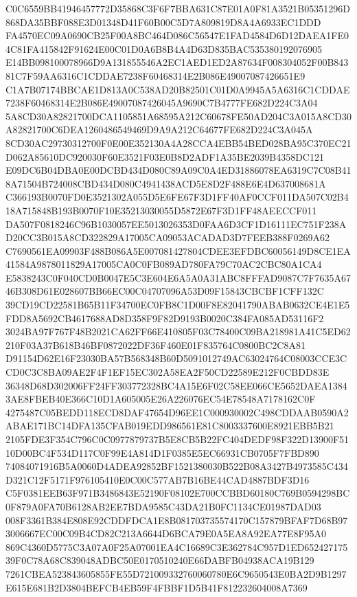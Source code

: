 \documentclass[UTF8,fontset=fandol,zihao=-4,a4paper]{ctexart}
\begin{document}
{{C0C6559BB41946457772D35868C3F6F7BBA631C87E01A0F81A3521B05351296D868DA35BBF088E3D01348D41F60B00C5D7A809819D8A4A6933EC1DDD
FA4570EC09A0690CB25F00A8BC464D086C56547E1FAD4584D6D12DAEA1FE04C81FA415842F91624E00C01D0A6B8B4A4D63D835BAC535380192076905
E14BB098100078966D9A131855546A2EC1AED1ED2A87634F008304052F00B84381C7F59AA6316C1CDDAE7238F60468314E2B086E49007087426651E9
C1A7B07174BBCAE1D813A0C538AD20B82501C01D0A9945A5A6316C1CDDAE7238F60468314E2B086E49007087426045A9690C7B4777FE682D224C3A04
5A8CD30A82821700DCA1105851A68595A212C60678FE50AD204C3A015A8CD30A82821700C6DEA1260486549469D9A9A212C64677FE682D224C3A045A
8CD30AC29730312700F0E00E352130A4A28CCA4EBB54BED028BA95C370EC21D062A85610DC920030F60E3521F03E0B8D2ADF1A35BE2039B4358DC121
E09DC6B04DBA0E00DCBD434D080C89A09C0A4ED31886078EA6319C7C08B418A71504B724008CBD434D080C4941438ACD5E8D2F488E6E4D637008681A
C366193B0070FD0E3521302A055D5E6FE67F3D1FF40AF0CCF011DA507C02B418A715848B193B0070F10E35213030055D5872E67F3D1FF48AEECCF011
DA507F0818246C96B1030057EE5013026353D0FAA6D3CF1D16111EC751F238AD20CC3B015A8CD322829A17005CA09053ACADAD3D7FEEB388F0269A62
C7690561EA09903F488B086A5E007081427804CDEE3EFDBC60056149D8CE1EA41584A9878011829A17005CA0C0FB089AD780FA79C70AC2CBC80A1CA4
E5838243C0F040CD0B0047E5C3E604E6A5A0A31ABC8FFFAD9087C7F7635A6746B308D61E028607BB66EC00C04707096A53D09F15843CBCBF1CFF132C
39CD19CD22581B65B11F34700EC0FB8C1D00F8E82041790ABAB0632CE4E1E5FDD8A5692CB4617688AD8D358F9F82D9193B0020C384FA085AD53116F2
3024BA97F767F48B2021CA62FF66E410805F03C78400C09BA218981A41C5ED62210F03A37B618B46BF0872022DF36F460E01F835764C0800BC2C8A81
D91154D62E16F23030BA57B568348B60D5091012749AC63024764C08003CCE3CCD0C3C8BA09AE2F4F1EF15EC302A58EA2F50CD22589E212F0CBDD83E
36348D68D302006FF24FF303772328BC4A15E6F02C58EE066CE5652DAEA13843AE8FBEB40E366C10D1A605005E26A226076EC54E78548A7178162C0F
4275487C05BEDD118ECD8DAF47654D96EE1C000930002C498CDDAAB0590A2ABAE171BC14DFA135CFAB019EDD986561E81C8003337600E8921EBB5B21
2105FDE3F354C796C0C0977879737B5E8CB5B22FC404DEDF98F322D13900F5110D00BC4F534D117C0F99E4A814D1F0385E5EC66931CB0705F7FBD890
74084071916B5A0060D4ADEA92852BF1521380030B522B08A3427B4973585C434D321C12F5171F976105410E0C00C577AB7B16BE44CAD4887BDF3D16
C5F0381EEB63F971B3486843E52190F08102E700CCBBD60180C769B0594298BC0F879A0FA70B6128AB2EE7BDA9585C43DA21B0FC1134CE01987DAD03
008F3361B384E808E92CDDFDCA1E8B081703735574170C157879BFAF7D68B973006667EC00C09B4CD82C213A6644D6BCA79E0A5EA8A92EA77E8F95A0
869C4360D5775C3A07A0F25A07001EA4C16689C3E362784C957D1ED65242717539F0C78A68C839048ADBC50E0170510240E66DABFB04938ACA19B129
7261CBEA523843605855FE55D721009332760060780E6C9650543E0BA2D9B1297E615E681B2D3804BEFCB4EB59F4FBBF1D5B41F812232604008A7369
}}
\end{document}

